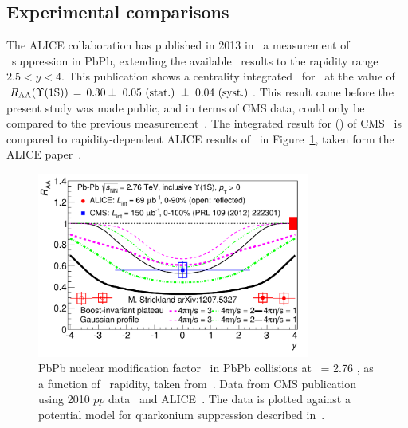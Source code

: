 \subsection{Experimental comparisons}
The ALICE collaboration has published in 2013 in~\cite{ALICEUpsilonHI} a measurement of \PgUa\ suppression in PbPb, extending
the available \RAA\ results to the rapidity range $2.5 < y < 4$. This
publication shows a centrality integrated \RAA\ for \PgUa\ at the
value of $\RAA(\PgUa)\,=\,0.30 \pm\ 0.05~\textrm{(stat.)}~\pm\
0.04~\textrm{(syst.)}$. This result came before the present study was
made public, and in terms of CMS data, could only be compared to the
previous measurement~\cite{11-011}. The integrated result for \RAA(\PgUa) of
CMS~\cite{11-011} is compared to rapidity-dependent ALICE results
of~\cite{ALICEUpsilonHI} in
Figure~\ref{fig:alicepaper}, taken form the ALICE paper~\cite{ALICEUpsilonHI}.
\begin{figure}[h]
  \begin{centering}  
    \includegraphics[width=0.8\textwidth]{Chapters/aUpsilon/Raa_th_rapidityStrick-5922.pdf}
    \caption{PbPb nuclear modification factor \RAA\ in PbPb collisions
    at \snn\ = 2.76 \TeV, as a function of \PgU\ rapidity, taken
    from~\cite{ALICEUpsilonHI}. Data from CMS publication using 2010
    $pp$ data~\cite{11-011} and ALICE~\cite{ALICEUpsilonHI}. The data
    is plotted against a potential model for quarkonium suppression
    described in~\cite{Strickland:2012cq}.}
    \label{fig:alicepaper}
  \end{centering}  
\end{figure}

